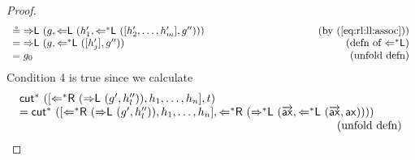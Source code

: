 \documentclass[a4paper,UKenglish,cleveref,autoref,thm-restate, anonymous]{lipics-v2021}
\renewcommand{\vec}[1]{\overrightarrow{#1}}
\newcommand{\Larr}{\Leftarrow}
\newcommand{\Ls}{\Leftarrow^*}
\newcommand{\Rarr}{\Rightarrow}
\newcommand{\Rs}{\Rightarrow^*}
\newcommand{\mf}[1]{\mathsf{#1}}
\newcommand{\ax}{\mathsf{ax}}
\newcommand{\Ll}{{\Larr}\mathsf{L}}
\newcommand{\Lsl}{{\Ls}\mathsf{L}}
\newcommand{\Lsr}{{\Ls}\mathsf{R}}
\newcommand{\Rl}{{\Rarr}\mathsf{L}}
\newcommand{\Rsl}{{\Rs}\mathsf{L}}
\newcommand{\cut}{\mf{cut}}
\newcommand{\cuts}{\mf{cut}^*}
\begin{document}
\begin{proof}
\[\begin{array}{lr}
    \circeq \Rl \ (g, \Ll \ (h'_1, \Lsl\ ([h'_2,\dots,h'_m],g'')))
    &\hspace*{+3.5cm}\text{(by (\ref{eq:rl:ll:assoc}))}
    \\
    = \Rl \ (g, \Lsl \ ([h'_j], g''))
    &\hspace*{+3.5cm}\text{(defn of $\Lsl$)}
    \\
    = g_0
    &\hspace*{+3.5cm}\text{(unfold defn)}
        \end{array}
\]
Condition 4 is true since we calculate
\[
\begin{array}{lr}
  \cuts \ ([\Lsr \ (\Rl \ (g', h''_l)), h_1,\dots,h_n],t)
  &
  \\
  = \cuts \ ([\Lsr \ (\Rl \ (g', h''_l)), h_1,\dots,h_n],\Lsr \ (\Rsl \ (\vec{\ax}, \Lsl \ (\vec{\ax}, \ax))))
  &
    \\
    &\hspace*{-1.5cm}\text{(unfold defn)}  
    \\

\end{array}\]
\end{proof}
\end{document}
